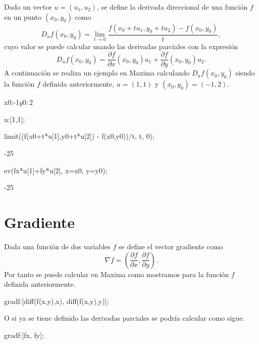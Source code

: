 Dado un vector
$u = (u_1, u_2)$,
se define la derivada direccional
de una función $f$ en un punto $(x_0, y_0)$
como
\begin{equation*}
 D_uf(x_0,y_0) =
 \lim_{t\to0} \frac{f(x_0+tu_1,y_0+tu_2)-f(x_0,y_0)}{t},
\end{equation*}
cuyo valor se puede calcular
usando las derivadas parciales con la expresión
\begin{equation*}
 D_uf(x_0,y_0) =
 \frac{\partial f}{\partial x}(x_0,y_0)u_1
 +
 \frac{\partial f}{\partial y}(x_0,y_0)u_2.
\end{equation*}
A continuación se realiza un ejemplo en Maxima
calculando $D_uf(x_0,y_0)$ siendo la función
$f$ definida anteriormente,
$u=(1,1)$
y $(x_0,y_0) = (-1,2)$.
\begin{maximai}
 x0:-1$ y0:2$
\end{maximai}
\begin{maximai}
 u:[1,1];
\end{maximai}
\begin{maximao}
 \left[ 1\operatorname{,}1\right]
\end{maximao}
\begin{maximai}
 limit((f(x0+t*u[1],y0+t*u[2]) - f(x0,y0))/t, t, 0);
\end{maximai}
\begin{maximao}
 -25
\end{maximao}
\begin{maximai}
 ev(fx*u[1]+fy*u[2], x=x0, y=y0);
\end{maximai}
\begin{maximao}
 -25
\end{maximao}


\section{Gradiente}

Dada una función de dos variables $f$ se define
el vector gradiente como
\begin{equation*}
 \nabla f =
 \left(
 \frac{\partial f}{\partial x},
 \frac{\partial f}{\partial y}
 \right).
\end{equation*}
Por tanto se puede calcular en Maxima como mostramos
para la función $f$ definida anteriormente.
\begin{maximai}
 gradf:[diff(f(x,y),x), diff(f(x,y),y)];
\end{maximai}
\begin{maximao}
\end{maximao}
O si ya se tiene definido las derivadas parciales
se podría calcular como sigue.
\begin{maximai}
 gradf:[fx, fy];
\end{maximai}
\begin{maximao}
\end{maximao}

